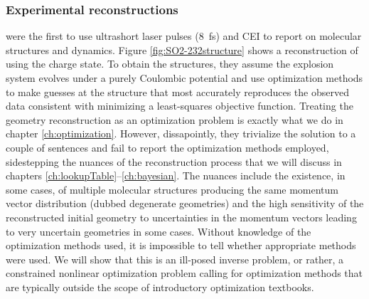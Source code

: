 \subsubsection*{Experimental reconstructions}
\citet{Legare05structure,Legare05dynamics} were the first to use ultrashort laser pulses (\SI{8}{\fs}) and CEI to report on molecular structures and dynamics. Figure \ref{fig:SO2-232structure} shows a reconstruction of  using the  charge state. To obtain the structures, they assume the explosion system evolves under a purely Coulombic potential and use optimization methods to make guesses at the structure that most accurately reproduces the observed data consistent with minimizing a least-squares objective function. Treating the geometry reconstruction as an optimization problem is exactly what we do in chapter \ref{ch:optimization}. However, dissapointly, they trivialize the solution to a couple of sentences and fail to report the optimization methods employed, sidestepping the nuances of the reconstruction process that we will discuss in chapters \ref{ch:lookupTable}--\ref{ch:bayesian}. The nuances include the existence, in some cases, of multiple molecular structures producing the same momentum vector distribution (dubbed degenerate geometries) and the high sensitivity of the reconstructed initial geometry to uncertainties in the momentum vectors leading to very uncertain geometries in some cases. Without knowledge of the optimization methods used, it is impossible to tell whether appropriate methods were used. We will show that this is an ill-posed inverse problem, or rather, a constrained nonlinear optimization problem calling for optimization methods that are typically outside the scope of introductory optimization textbooks.

